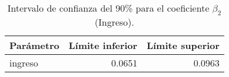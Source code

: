 \begin{table}[H]
    \centering
    \color{blue}
    \caption{Intervalo de confianza del 90\% para el coeficiente $\beta_2$ (Ingreso).}
    \label{tab:ci_beta2}
    \begin{tabular}{lrr}
        \toprule
        Parámetro & Límite inferior & Límite superior \\
        \midrule
        ingreso & 0.0651 & 0.0963 \\
        \bottomrule
    \end{tabular}
\end{table}
